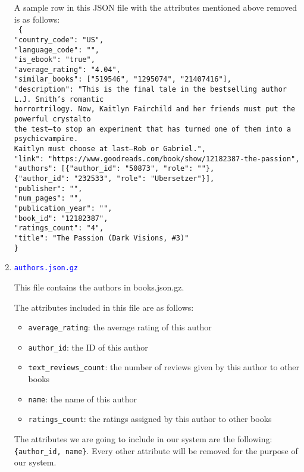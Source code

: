 \documentclass[fontsize=11pt]{article}
\begin{document}
\begin{enumerate}
A sample row in this JSON file with the attributes mentioned above removed is as follows:\\
\texttt{
\{ \\
"country\_code": "US",\\
"language\_code": "",\\
"is\_ebook": "true",\\
"average\_rating": "4.04",\\
"similar\_books": ["519546", "1295074", "21407416"],\\
"description": "This is the final tale in the bestselling author L.J. Smith's romantic \\horrortrilogy. Now, Kaitlyn Fairchild and her friends must put the powerful crystalto \\the
test--to stop an experiment that has turned one of them into a psychicvampire. \\Kaitlyn must choose at last--Rob or Gabriel.",\\
"link": "https://www.goodreads.com/book/show/12182387-the-passion",\\
"authors": [\{"author\_id": "50873", "role": ""\}, \\
\{"author\_id": "232533", "role": "Ubersetzer"\}],\\
"publisher": "",\\
"num\_pages": "",\\
"publication\_year": "",\\
"book\_id": "12182387",\\
"ratings\_count": "4",\\
"title": "The Passion (Dark Visions, \#3)" \\
\}
} \\

\item \textcolor{blue}{\texttt{authors.json.gz}}

This file contains the authors in books.json.gz.

The attributes included in this file are as follows:
\begin{itemize}
  \item \texttt{average\_rating}: the average rating of this author
  \item \texttt{author\_id}: the ID of this author
  \item \texttt{text\_reviews\_count}: the number of reviews given by this author to other books
  \item \texttt{name}: the name of this author
  \item \texttt{ratings\_count}: the ratings assigned by this author to other books
\end{itemize}
The attributes we are going to include in our system are the following:
\texttt{\{author\_id, name\}}. Every other attribute will be removed for the purpose of our system.


\end{enumerate}
\end{document}
